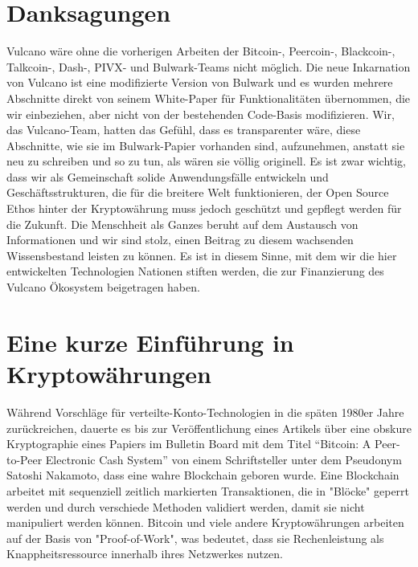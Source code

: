 \documentclass[A4paper, 12pt]{article}
\begin{document}
\section{Danksagungen }
Vulcano wäre ohne die vorherigen Arbeiten der Bitcoin-, Peercoin-, Blackcoin-, Talkcoin-, Dash-, PIVX- und Bulwark-Teams nicht möglich. Die neue Inkarnation von Vulcano ist eine modifizierte Version von Bulwark und es wurden mehrere Abschnitte direkt von seinem White-Paper für Funktionalitäten übernommen, die wir einbeziehen, aber nicht von der bestehenden Code-Basis modifizieren. Wir, das Vulcano-Team, hatten das Gefühl, dass es transparenter wäre, diese Abschnitte, wie sie im Bulwark-Papier vorhanden sind, aufzunehmen, anstatt sie neu zu schreiben und so zu tun, als wären sie völlig originell. Es ist zwar wichtig, dass wir als Gemeinschaft solide Anwendungsfälle entwickeln und Geschäftsstrukturen, die für die breitere Welt funktionieren, der Open Source Ethos hinter der Kryptowährung muss jedoch geschützt und gepflegt werden für die Zukunft. Die Menschheit als Ganzes beruht auf dem Austausch von Informationen und wir sind stolz, einen Beitrag zu diesem wachsenden Wissensbestand leisten zu können. Es ist in diesem Sinne, mit dem wir die hier entwickelten Technologien Nationen stiften werden, die zur Finanzierung des Vulcano Ökosystem beigetragen haben. 

\section{Eine kurze Einführung in Kryptowährungen}
Während Vorschläge für verteilte-Konto-Technologien in die späten 1980er Jahre zurückreichen, dauerte es bis zur Veröffentlichung eines Artikels über eine obskure Kryptographie eines Papiers im Bulletin Board mit dem Titel ``Bitcoin: A Peer-to-Peer Electronic Cash System'' von einem Schriftsteller unter dem Pseudonym Satoshi Nakamoto, dass eine wahre Blockchain geboren wurde. Eine Blockchain arbeitet mit sequenziell zeitlich markierten Transaktionen, die in "Blöcke" geperrt werden und durch verschiede Methoden validiert werden, damit sie nicht manipuliert werden können. Bitcoin und viele andere Kryptowährungen arbeiten auf der Basis von "Proof-of-Work", was bedeutet, dass sie Rechenleistung als Knappheitsressource innerhalb ihres Netzwerkes nutzen.
\end{document}
